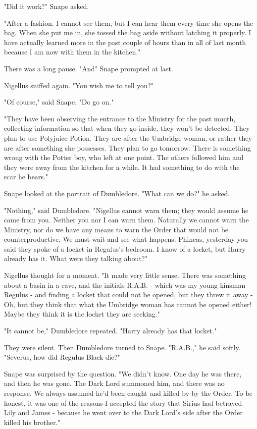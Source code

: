 "Did it work?" Snape asked.

"After a fashion. I cannot see them, but I can hear them every time she opens the bag. When she put me in, she tossed the bag aside without latching it properly. I have actually learned more in the past couple of hours than in all of last month because I am now with them in the kitchen."

There was a long pause. "And{\el}" Snape prompted at last.

Nigellus sniffed again. "You wish me to tell you?"

"Of course," said Snape. "Do go on."

"They have been observing the entrance to the Ministry for the past month, collecting information so that when they go inside, they won't be detected. They plan to use Polyjuice Potion. They are after the Umbridge woman, or rather they are after something she possesses. They plan to go tomorrow. There is something wrong with the Potter boy, who left at one point. The others followed him and they were away from the kitchen for a while. It had something to do with the scar he bears."

Snape looked at the portrait of Dumbledore. "What can we do?" he asked.

"Nothing," said Dumbledore. "Nigellus cannot warn them; they would assume he came from you. Neither you nor I can warn them. Naturally we cannot warn the Ministry, nor do we have any means to warn the Order that would not be counterproductive. We must wait and see what happens. Phineas, yesterday you said they spoke of a locket in Regulus's bedroom. I know of a locket, but Harry already has it. What were they talking about?"

Nigellus thought for a moment. "It made very little sense. There was something about a basin in a cave, and the initials R.A.B. - which was my young kinsman Regulus - and finding a locket that could not be opened, but they threw it away - Oh, but they think that what the Umbridge woman has cannot be opened either! Maybe they think it is the locket they are seeking."

"It cannot be," Dumbledore repeated. "Harry already has that locket."

They were silent. Then Dumbledore turned to Snape. "R.A.B.," he said softly. "Severus, how did Regulus Black die?"

Snape was surprised by the question. "We didn't know. One day he was there, and then he was gone. The Dark Lord summoned him, and there was no response. We always assumed he'd been caught and killed by{\el} by the Order. To be honest, it was one of the reasons I accepted the story that Sirius had betrayed Lily and James - because he went over to the Dark Lord's side after the Order killed his brother."

